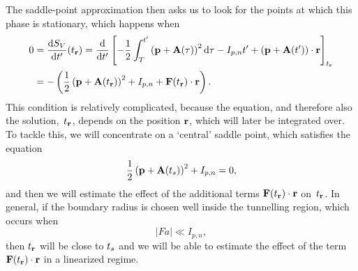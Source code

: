 The saddle-point approximation then asks us to look for the points at which this phase is stationary, which happens when
\begin{align}
0 & =
\frac{\mathrm{d} S_V}{\mathrm{d} t'}({t_{\vb{r}}})
=
\frac{\mathrm{d}}{\mathrm{d} t'}\left[-\frac{1}{2} \int_T^{t'}\left(\vb{p}+\vb{A}(\tau)\right)^2\mathrm{d}\tau- I_{p,n} t'+\left(\vb{p}+\vb{A}(t')\right)\cdot\vb{r}\right]_{{t_{\vb{r}}}}
\nonumber \\ & = 
-\left(\frac{1}{2} \left(\vb{p}+\vb{A}({t_{\vb{r}}})\right)^2+ I_{p,n} + \vb{F}({t_{\vb{r}}})\cdot\vb{r}\right)
.
\end{align}
This condition is relatively complicated, because the equation, and therefore also the solution,~${t_{\vb{r}}}$, depends on the position $\vb{r}$, which will later be integrated over. To tackle this, we will concentrate on a `central' saddle point, which satisfies the equation
\begin{equation}
\frac{1}{2} \left(\vb{p}+\vb{A}({t_s})\right)^2+ I_{p,n}=0,
\label{e2-ts-equation}
\end{equation}
and then we will estimate the effect of the additional terms $\vb{F}({t_{\vb{r}}})\cdot\vb{r}$ on~${t_{\vb{r}}}$. In general, if the boundary radius is chosen well inside the tunnelling region, which occurs when
\begin{equation}
|Fa|\ll I_{p,n},
\label{e2-Fa-Ip-restriction}
\end{equation}
then ${t_{\vb{r}}}$ will be close to ${t_s}$ and we will be able to estimate the effect of the term $\vb{F}({t_{\vb{r}}})\cdot\vb{r}$ in a linearized regime.


